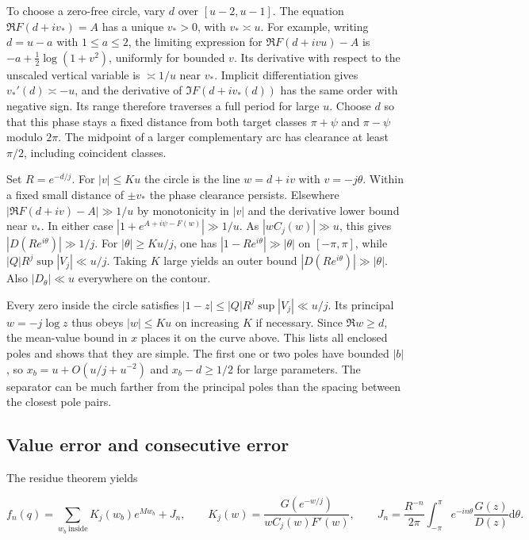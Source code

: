 \documentclass[11pt]{article}
\begin{document}
To choose a zero-free circle, vary \(d\) over \([u-2,u-1]\). The equation \(\Re F(d+iv_*)=A\) has a unique \(v_*>0\), with \(v_*\asymp u\). For example, writing \(d=u-a\) with \(1\le a\le2\), the limiting expression for \(\Re F(d+ivu)-A\) is \(-a+\tfrac12\log(1+v^2)\), uniformly for bounded \(v\). Its derivative with respect to the unscaled vertical variable is \(\asymp1/u\) near \(v_*\). Implicit differentiation gives \(v_*'(d)\asymp-u\), and the derivative of \(\Im F(d+iv_*(d))\) has the same order with negative sign. Its range therefore traverses a full period for large \(u\). Choose \(d\) so that this phase stays a fixed distance from both target classes \(\pi+\psi\) and \(\pi-\psi\) modulo \(2\pi\). The midpoint of a larger complementary arc has clearance at least \(\pi/2\), including coincident classes.

Set \(R=e^{-d/j}\). For \(|v|\le Ku\) the circle is the line \(w=d+iv\) with \(v=-j\theta\). Within a fixed small distance of \(\pm v_*\) the phase clearance persists. Elsewhere \(|\Re F(d+iv)-A|\gg 1/u\) by monotonicity in \(|v|\) and the derivative lower bound near \(v_*\). In either case \(|1+e^{A+i\psi-F(w)}|\gg1/u\). As \(|wC_j(w)|\gg u\), this gives \(|D(Re^{i\theta})|\gg 1/j\). For \(|\theta|\ge Ku/j\), one has \(|1-Re^{i\theta}|\gg|\theta|\) on \([-\pi,\pi]\), while \(|Q|R^j\sup|V_j|\ll u/j\). Taking \(K\) large yields an outer bound \(|D(Re^{i\theta})|\gg|\theta|\). Also \(|D_\theta|\ll u\) everywhere on the contour.

Every zero inside the circle satisfies \(|1-z|\le |Q|R^j\sup|V_j|\ll u/j\). Its principal \(w=-j\log z\) thus obeys \(|w|\le Ku\) on increasing \(K\) if necessary. Since \(\Re w\ge d\), the mean-value bound in \(x\) places it on the curve above. This lists all enclosed poles and shows that they are simple. The first one or two poles have bounded \(|b|\), so \(x_b=u+O(u/j+u^{-2})\) and \(x_b-d\ge1/2\) for large parameters. The separator can be much farther from the principal poles than the spacing between the closest pole pairs.

\subsection{Value error and consecutive error}
\label{sec:value-error-and-consecutive-error}

The residue theorem yields

\begin{equation*}
f_n(q)=\sum_{w_b\ \mathrm{inside}}K_j(w_b)e^{Mw_b}+J_n,
\qquad K_j(w)=\frac{G(e^{-w/j})}{w C_j(w)F'(w)},\qquad
J_n=\frac{R^{-n}}{2\pi}\int_{-\pi}^{\pi}e^{-in\theta}\frac{G(z)}{D(z)}\mathrm{d}\theta .
\end{equation*}
\end{document}
